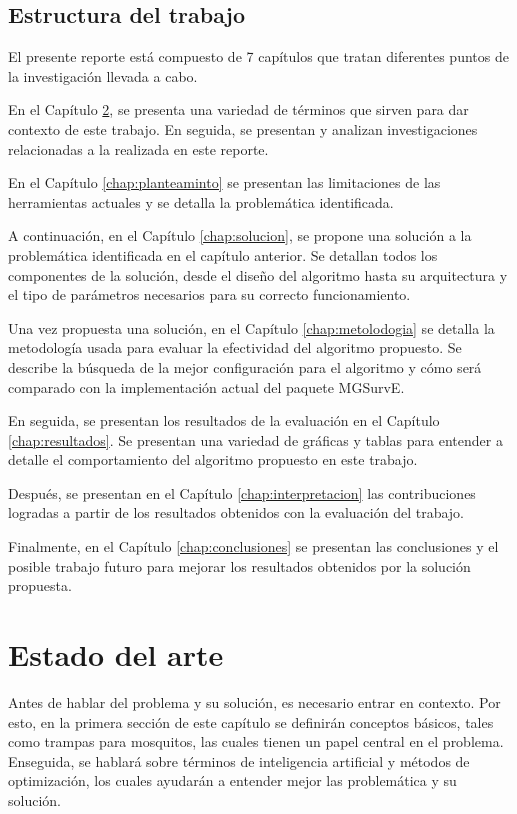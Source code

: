 \documentclass[letterpaper]{report}
\begin{document}
  \section{Estructura del trabajo}

  El presente reporte está compuesto de 7 capítulos que tratan diferentes puntos
  de la investigación llevada a cabo.

  En el Capítulo \ref{chap:estado-del-arte}, se presenta una variedad de
  términos que sirven para dar contexto de este trabajo. En seguida, se
  presentan y analizan investigaciones relacionadas a la realizada en este
  reporte.

  En el Capítulo \ref{chap:planteaminto} se presentan las limitaciones de las
  herramientas actuales y se detalla la problemática identificada.

  A continuación, en el Capítulo \ref{chap:solucion}, se propone una solución
  a la problemática identificada en el capítulo anterior. Se detallan todos los
  componentes de la solución, desde el diseño del algoritmo hasta su
  arquitectura y el tipo de parámetros necesarios para su correcto
  funcionamiento.

  Una vez propuesta una solución, en el Capítulo \ref{chap:metolodogia} se
  detalla la metodología usada para evaluar la efectividad del algoritmo
  propuesto. Se describe la búsqueda de la mejor configuración para el algoritmo
  y cómo será comparado con la implementación actual del paquete MGSurvE.

  En seguida, se presentan los resultados de la evaluación en el Capítulo
  \ref{chap:resultados}. Se presentan una variedad de gráficas y tablas para
  entender a detalle el comportamiento del algoritmo propuesto en este trabajo.

  Después, se presentan en el Capítulo \ref{chap:interpretacion} las
  contribuciones logradas a partir de los resultados obtenidos con la evaluación
  del trabajo.

  Finalmente, en el Capítulo \ref{chap:conclusiones} se presentan las
  conclusiones y el posible trabajo futuro para mejorar los resultados obtenidos
  por la solución propuesta.

\chapter{Estado del arte}\label{chap:estado-del-arte}
  Antes de hablar del problema y su solución, es necesario entrar en contexto.
  Por esto, en la primera sección de este capítulo se definirán conceptos
  básicos, tales como trampas para mosquitos, las cuales tienen un papel central
  en el problema. Enseguida, se hablará sobre términos de inteligencia
  artificial y métodos de optimización, los cuales ayudarán a entender mejor las
  problemática y su solución.
  
\end{document}
